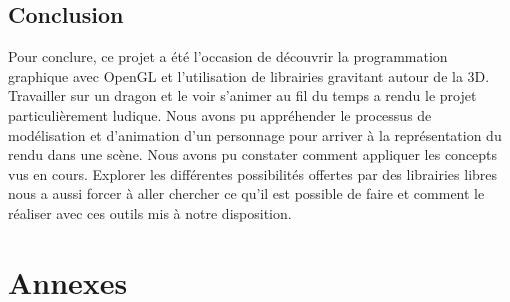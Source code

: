 \documentclass[a4paper]{report}
\begin{document}
\section{Conclusion}
\par
Pour conclure, ce projet a été l'occasion de découvrir la programmation graphique avec OpenGL et l'utilisation de librairies gravitant autour de la 3D. Travailler sur un dragon et le voir s'animer au fil du temps a rendu le projet particulièrement ludique.
Nous avons pu appréhender le processus de modélisation et d'animation d'un personnage pour arriver à la représentation du rendu dans une scène. Nous avons pu constater comment appliquer les concepts vus en cours. Explorer les différentes possibilités offertes par des librairies libres nous a aussi forcer à aller chercher ce qu'il est possible de faire et comment le réaliser avec ces outils mis à notre disposition.


\newpage
\chapter{Annexes}
\end{document}
